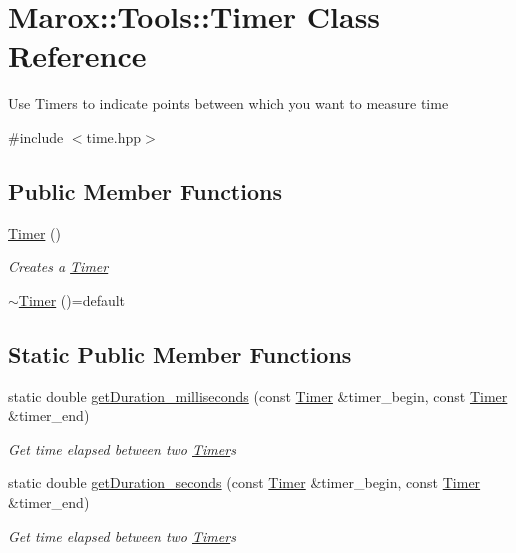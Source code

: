 \hypertarget{class_marox_1_1_tools_1_1_timer}{}\section{Marox\+:\+:Tools\+:\+:Timer Class Reference}
\label{class_marox_1_1_tools_1_1_timer}


Use Timers to indicate \textquotesingle{}points\textquotesingle{} between which you want to measure time  




{\ttfamily \#include $<$time.\+hpp$>$}

\subsection*{Public Member Functions}
\begin{DoxyCompactItemize}
\item 
\hyperlink{class_marox_1_1_tools_1_1_timer_a25c3140d99c2461d8efd515af5c00dab}{Timer} ()
\begin{DoxyCompactList}\small\item\em Creates a {\ttfamily \hyperlink{class_marox_1_1_tools_1_1_timer}{Timer}} \end{DoxyCompactList}\item 
\hyperlink{class_marox_1_1_tools_1_1_timer_af7aac9aa1c7b8b1afd6444be3f64b578}{$\sim$\+Timer} ()=default
\end{DoxyCompactItemize}
\subsection*{Static Public Member Functions}
\begin{DoxyCompactItemize}
\item 
static double \hyperlink{class_marox_1_1_tools_1_1_timer_a8889e17ae34fad0f0f0975cca6b19228}{get\+Duration\+\_\+milliseconds} (const \hyperlink{class_marox_1_1_tools_1_1_timer}{Timer} \&timer\+\_\+begin, const \hyperlink{class_marox_1_1_tools_1_1_timer}{Timer} \&timer\+\_\+end)
\begin{DoxyCompactList}\small\item\em Get time elapsed between two {\ttfamily \hyperlink{class_marox_1_1_tools_1_1_timer}{Timer}s} \end{DoxyCompactList}\item 
static double \hyperlink{class_marox_1_1_tools_1_1_timer_a56c214f72b6d9fd5be26ecc646e8e538}{get\+Duration\+\_\+seconds} (const \hyperlink{class_marox_1_1_tools_1_1_timer}{Timer} \&timer\+\_\+begin, const \hyperlink{class_marox_1_1_tools_1_1_timer}{Timer} \&timer\+\_\+end)
\begin{DoxyCompactList}\small\item\em Get time elapsed between two {\ttfamily \hyperlink{class_marox_1_1_tools_1_1_timer}{Timer}s} \end{DoxyCompactList}\end{DoxyCompactItemize}


